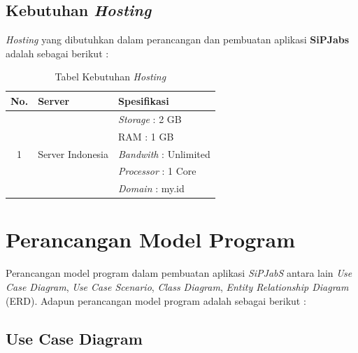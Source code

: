 \subsection{Kebutuhan \textit{Hosting}}

\textit{Hosting} yang dibutuhkan dalam perancangan dan pembuatan aplikasi\textbf{ SiPJabs}
adalah sebagai berikut :

\begin{table}[H]
	\centering
	\caption{Tabel Kebutuhan \textit{Hosting}}
	\begin{tabular}{ | c | l | l | }
		\hline
		No. & Server & Spesifikasi \\
		\hline
		\multirow{5}{*}{1} & \multirow{5}{*}{Server Indonesia} & \textit{Storage} : 2 GB \\
		& & RAM : 1 GB \\
		& & \textit{Bandwith} : Unlimited \\
		& & \textit{Processor} : 1 Core \\
		& & \textit{Domain} : my.id  \\
	
		\hline
	\end{tabular}
\end{table}

\section{Perancangan Model Program}
Perancangan model program dalam pembuatan aplikasi \textit{SiPJabS} antara
lain \textit{Use Case Diagram}, \textit{Use Case Scenario}, \textit{Class Diagram},
\textit{Entity Relationship Diagram} (ERD). Adapun perancangan model program adalah sebagai berikut :

\subsection{Use Case Diagram}

